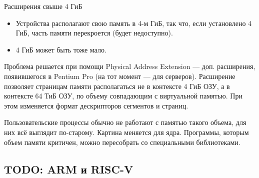\documentclass[xetex,aspectratio=43]{beamer}
\begin{document}
\begin{frame}{Расширения свыше 4 ГиБ}
    \begin{itemize}
        \item
        Устройства располагают свою память в 4-м ГиБ, так что, если
        установлено 4 ГиБ, часть памяти перекроется (будет недоступно).
        \item
        4 ГиБ может быть тоже мало.
    \end{itemize}

    Проблема решается при помощи Physical Address Extension --- доп.
    расширения, появившегося в Pentium Pro (на тот момент --- для серверов).
    Расширение позволяет страницам памяти располагаться не в контексте 4 ГиБ
    ОЗУ, а в контексте 64 ТиБ ОЗУ, по объему совпадающим с виртуальной
    памятью. При этом изменяется формат дескрипторов сегментов и страниц.

    Пользовательские процессы обычно не работают с памятью такого объема,
    для них всё выглядит по-старому. Картина меняется для ядра. Программы,
    которым объем памяти критичен, можно пересобрать со специальными
    библиотеками.
\end{frame}

\subsection{TODO: ARM и RISC-V}

\section*{}
\end{document}
